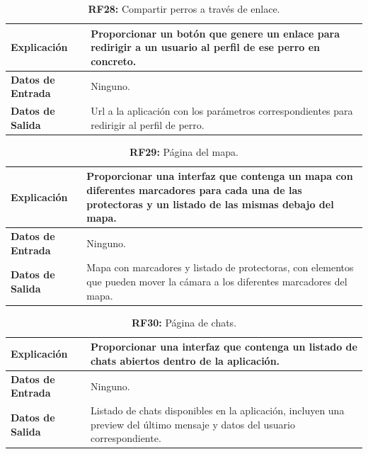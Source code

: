 \documentclass[a4paper, 12pt]{article}
\begin{document}
\begin{table}[H]
\captionsetup{justification=raggedright,singlelinecheck=false}
\caption{\textbf{RF28:} Compartir perros a través de enlace.}
\label{tab:RF28}
	\begin{tabular}{|m{5cm}|m{10cm}|}
	\hline
	\textbf{Explicación} & Proporcionar un botón que genere un enlace para redirigir a un usuario al perfil de ese perro en concreto. \\ 
	\hline
	\textbf{Datos de Entrada} & Ninguno. \\ 
	\hline
	\textbf{Datos de Salida} & Url a la aplicación con los parámetros correspondientes para redirigir al perfil de perro. \\ 
	\hline
\end{tabular}
\end{table}

\begin{table}[H]
\captionsetup{justification=raggedright,singlelinecheck=false}
\caption{\textbf{RF29:} Página del mapa.}
\label{tab:RF29}
	\begin{tabular}{|m{5cm}|m{10cm}|}
	\hline
	\textbf{Explicación} & Proporcionar una interfaz que contenga un mapa con diferentes marcadores para cada una de las protectoras y un listado de las mismas debajo del mapa. \\ 
	\hline
	\textbf{Datos de Entrada} & Ninguno. \\ 
	\hline
	\textbf{Datos de Salida} & Mapa con marcadores y listado de protectoras, con elementos que pueden mover la cámara a los diferentes marcadores del mapa. \\ 
	\hline
\end{tabular}
\end{table}


\begin{table}[H]
\captionsetup{justification=raggedright,singlelinecheck=false}
\caption{\textbf{RF30:} Página de chats.}
\label{tab:RF30}
	\begin{tabular}{|m{5cm}|m{10cm}|}
	\hline
	\textbf{Explicación} & Proporcionar una interfaz que contenga un listado de chats abiertos dentro de la aplicación. \\ 
	\hline
	\textbf{Datos de Entrada} & Ninguno. \\ 
	\hline
	\textbf{Datos de Salida} & Listado de chats disponibles en la aplicación, incluyen una preview del último mensaje y datos del usuario correspondiente. \\ 
	\hline
\end{tabular}
\end{table}
\end{document}
